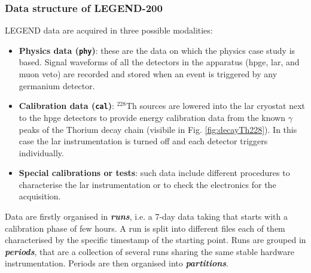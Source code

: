 \subsubsection{Data structure of LEGEND-200}
\label{subsubsec:data-structureL200}
LEGEND data are acquired in three possible modalities:
\begin{itemize}
    \item \textbf{Physics data (\texttt{phy})}: these are the data on which the physics case study is based. Signal waveforms of all the detectors in the apparatus (\ac{hpge}, \ac{lar}, and muon veto) are recorded and stored when an event is triggered by any germanium detector.
    \item \textbf{Calibration data (\texttt{cal})}: ${}^{228}$Th sources are lowered into the \ac{lar} cryostat next to the \ac{hpge} detectors to provide energy calibration data from the known $\gamma$ peaks of the Thorium decay chain (visibile in Fig. \ref{fig:decayTh228}). In this case the \ac{lar} instrumentation is turned off and each detector triggers individually.
    \item \textbf{Special calibrations or tests}: such data include different procedures to characterise the \ac{lar} instrumentation or to check the electronics for the acquisition.
\end{itemize}

Data are firstly organised in \textbf{\textit{runs}}, i.e. a 7-day data taking that starts with a calibration phase of few hours. A run is split into different files each of them characterised by the specific timestamp of the starting point. Runs are grouped in \textbf{\textit{periods}}, that are a collection of several runs sharing the same stable hardware instrumentation. Periods are then organised into \textbf{\textit{partitions}}. 

